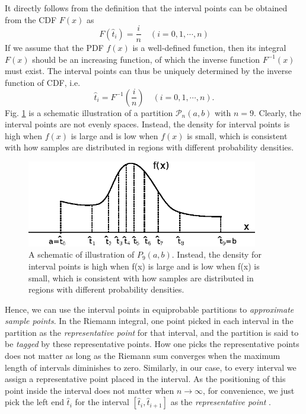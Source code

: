 It directly follows from the definition that the interval points can be obtained from the CDF $ F(x) $ as
\begin{equation}
F(\hat{t}_i) = \frac{i}{n} \quad (i=0,1,\cdots,n)
\end{equation}
If we assume that the PDF $ f(x) $ is a well-defined function, then its integral $ F(x) $ should be an increasing function, of which the inverse function $ F^{-1}(x) $ must exist. The interval points can thus be uniquely determined by the inverse function of CDF, i.e.
\begin{equation}
\hat{t}_i = F^{-1} (\frac{i}{n}) \quad (i=0,1,\cdots, n).
\end{equation}
Fig. \ref{fig:ch2_partition_schematic} is a schematic illustration of a partition $ \mathcal{P}_n(a,b) $ with $ n=9 $. Clearly, the interval points are not evenly spaces. Instead, the density for interval points is high when $ f(x) $ is large and is low when $ f(x) $ is small, which is consistent with how samples are distributed in regions with different probability densities. 
\begin{figure}[htbp]
\begin{center}
\includegraphics[width=0.9\textwidth]{figures/ch2_partition_schematic.eps}
\caption{A schematic of illustration of $ P_9(a,b) $. Instead, the density for interval points is high when f(x) is large and is low when f(x) is small, which is consistent with how samples are distributed in regions with different probability densities.}
\label{fig:ch2_partition_schematic}
\end{center}
\end{figure}

Hence, we can use the interval points in equiprobable partitions to \textit{approximate sample points}. In the Riemann integral, one point picked in each interval in the partition as the \textit{representative point} for that interval, and the partition is said to be \textit{tagged} by these representative points. How one picks the representative points does not matter as long as the Riemann sum converges when the maximum length of intervals diminishes to zero. Similarly, in our case, to every interval we assign a representative point placed in the interval. As the positioning of this point inside the interval does not matter when $ n \rightarrow \infty $, for convenience, we just pick the left end $ \hat{t}_{i} $ for the interval $ [\hat{t}_i, \hat{t}_{i+1}] $ as the \textit{representative point} .  

